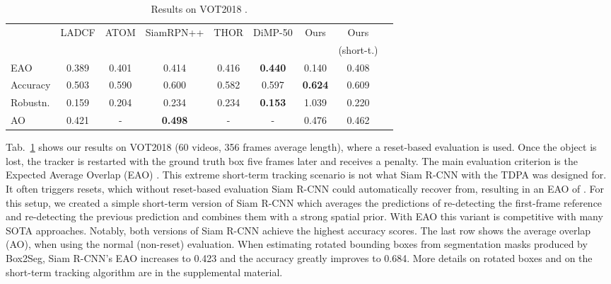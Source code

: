 \documentclass[10pt,twocolumn,letterpaper]{article}
\newcommand{\PAR}[1]{\vskip1pt \noindent {\bf #1~}}
\begin{document}
\begin{table}[t]
\centering{}\setlength{\tabcolsep}{1pt}
\footnotesize
\begin{tabular}{lcccccccc}
\toprule 
 & {\footnotesize{}LADCF } & {\footnotesize{}ATOM } & {\footnotesize{}SiamRPN++ } & THOR & {\footnotesize{}DiMP-50 } & {\footnotesize{}Ours } & {\footnotesize{}Ours} & \tabularnewline
& {\footnotesize{}\cite{Xu19TIP} } & {\footnotesize{}\cite{Danelljan19CVPR} } & {\footnotesize{}\cite{Li19CVPR} } & {\footnotesize{}\cite{Bhat19ICCV} } & {\footnotesize{}\cite{Sauer19BMVC}} & & {\scriptsize{}{(short-t.)}}  \tabularnewline
\midrule 
{\footnotesize{}EAO } & {\footnotesize{}0.389 } & {\footnotesize{}0.401 } & {\footnotesize{}0.414 } & {\footnotesize{}0.416} & \textbf{\footnotesize{}0.440}{\footnotesize{} } & {\footnotesize{}0.140 } & {\footnotesize{}0.408} & \tabularnewline
{\footnotesize{}Accuracy } & {\footnotesize{}0.503 } & {\footnotesize{}0.590 } & {\footnotesize{}0.600 } & {\footnotesize{}0.582} & {\footnotesize{}0.597 } & \textbf{\footnotesize{}0.624}{\footnotesize{} } & {\footnotesize{}0.609} & \tabularnewline
{\footnotesize{}Robustn. } & {\footnotesize{}0.159 } & {\footnotesize{}0.204 } & {\footnotesize{}0.234 } & {\footnotesize{}0.234} & \textbf{\footnotesize{}0.153 } & {\footnotesize{}1.039 } & {\footnotesize{}0.220} & \tabularnewline
\midrule 
{\footnotesize{}AO } & {\footnotesize{}0.421 } & {\footnotesize{}- } & \textbf{\footnotesize{}0.498}{\footnotesize{} } & {\footnotesize{}-} & {\footnotesize{}- } & {\footnotesize{}0.476 } & {\footnotesize{}0.462} & \tabularnewline
\bottomrule
\end{tabular}
\caption{Results on VOT2018 \cite{Kristan18ECCVW}.}
\label{tab:vot2018}
\end{table}
 
\PAR{VOT2018.} Tab.~\ref{tab:vot2018} shows our results on VOT2018 \cite{Kristan18ECCVW} (60 videos, 356 frames average length), where a reset-based evaluation is used. Once the object is lost, the tracker is restarted with the ground truth box five frames later and receives a penalty. The main evaluation criterion is the Expected Average Overlap (EAO) \cite{Kristan15ICCVW}.
This extreme short-term tracking scenario is not what Siam R-CNN with the TDPA was designed for. It often triggers resets, which without reset-based evaluation Siam R-CNN could automatically recover from, resulting in an EAO of . For this setup, we created a simple short-term version of Siam R-CNN which averages the predictions of re-detecting the first-frame reference and re-detecting the previous prediction and combines them with a strong spatial prior. With  EAO this variant is competitive with many SOTA approaches. Notably, both versions of Siam R-CNN achieve the highest accuracy scores. The last row shows the average overlap (AO), when using the normal (non-reset) evaluation. When estimating rotated bounding boxes from segmentation masks produced by Box2Seg, Siam R-CNN's EAO increases to 0.423 and the accuracy greatly improves to 0.684. More details on rotated boxes and on the short-term tracking algorithm are in the supplemental material.
\end{document}
